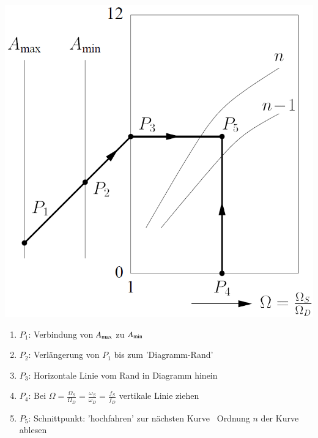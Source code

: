 \begin{minipage}[c]{0.42\columnwidth}
    \includegraphics[width=\columnwidth]{images/filter_nomogramme.png}
\end{minipage}
\hfill
\begin{minipage}[c]{0.56\columnwidth}
    \begin{center}
        \textbf{}
    \end{center}
    
    \begin{enumerate}
        \item $P_1$: Verbindung von $A_{\rm max}$ zu $A_{\rm min}$
        \item $P_2$: Verlängerung von $P_1$ bis zum 'Diagramm-Rand'
        \item $P_3$: Horizontale Linie vom Rand in Diagramm hinein
        \item $P_4$: Bei $\Omega = \frac{\Omega_S}{\Omega_D} = \frac{\omega_S}{\omega_D} = \frac{f_S}{f_D}$ vertikale Linie ziehen
        \item $P_5$: Schnittpunkt: 'hochfahren' zur nächsten Kurve \textrightarrow\ Ordnung $n$ der Kurve ablesen
    \end{enumerate}
\end{minipage}



